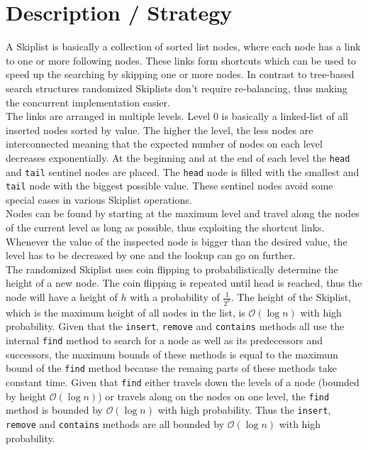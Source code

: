 
\section{Description / Strategy}

A Skiplist is basically a collection of sorted list nodes, where each node has a link to one or more following nodes. These links form shortcuts which can be used to speed up the searching by skipping one or more nodes. In contrast to tree-based search structures randomized Skiplists don't require re-balancing, thus making the concurrent implementation easier.\\

\noindent The links are arranged in multiple levels. Level $0$ is basically a linked-list of all inserted nodes sorted by value. The higher the level, the less nodes are interconnected meaning that the expected number of nodes on each level decreases exponentially. At the beginning and at the end of each level the \texttt{head} and \texttt{tail} sentinel nodes are placed. The \texttt{head} node is filled with the smallest and \texttt{tail} node with the biggest possible value. These sentinel nodes avoid some special cases in various Skiplist operations.\\

\noindent Nodes can be found by starting at the maximum level and travel along the nodes of the current level as long as possible, thus exploiting the shortcut links. Whenever the value of the inspected node is bigger than the desired value, the level has to be decreased by one and the lookup can go on further.\\

\noindent The randomized Skiplist uses coin flipping to probabilistically determine the height of a new node. The coin flipping is repeated until head is reached, thus the node will have a height of $h$ with a probability of $\frac{1}{2^h}$. The height of the Skiplist, which is the maximum height of all nodes in the list, is $\mathcal{O}(\log{n})$ with high probability. Given that the \texttt{insert}, \texttt{remove} and \texttt{contains} methods all use the internal \texttt{find} method to search for a node as well as its predecessors and successors, the maximum bounds of these methods is equal to the maximum bound of the \texttt{find} method because the remaing parts of these methods take constant time. Given that \texttt{find} either travels down the levels of a node (bounded by height $\mathcal{O}(\log{n})$) or travels along on the nodes on one level, the \texttt{find} method is bounded by $\mathcal{O}(\log{n})$ with high probability. Thus the \texttt{insert}, \texttt{remove} and \texttt{contains} methods are all bounded by $\mathcal{O}(\log{n})$ with high probability.

